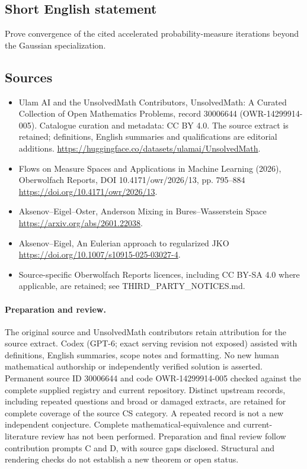 \documentclass[11pt]{article}
\begin{document}
\subsection{Short English statement}
Prove convergence of the cited accelerated probability-measure iterations beyond the Gaussian specialization.
\subsection{Sources}
\begin{itemize}
\item[\hypertarget{source:30006644:1}{S1}] Ulam AI and the UnsolvedMath Contributors, UnsolvedMath: A Curated Collection of Open Mathematics Problems, record 30006644 (OWR-14299914-005). Catalogue curation and metadata: CC BY 4.0. The source extract is retained; definitions, English summaries and qualifications are editorial additions.
\url{https://huggingface.co/datasets/ulamai/UnsolvedMath}.
\item[\hypertarget{source:30006644:2}{S2}] Flows on Measure Spaces and Applications in Machine Learning (2026), Oberwolfach Reports, DOI 10.4171/owr/2026/13, pp. 795--884
\url{https://doi.org/10.4171/owr/2026/13}.
\item[\hypertarget{source:30006644:3}{S3}] Aksenov--Eigel--Oster, Anderson Mixing in Bures--Wasserstein Space
\url{https://arxiv.org/abs/2601.22038}.
\item[\hypertarget{source:30006644:4}{S4}] Aksenov--Eigel, An Eulerian approach to regularized JKO
\url{https://doi.org/10.1007/s10915-025-03027-4}.
\item Source-specific Oberwolfach Reports licences, including CC BY-SA 4.0 where applicable, are retained; see THIRD\_PARTY\_NOTICES.md.
\end{itemize}
\paragraph{Preparation and review.}
The original source and UnsolvedMath contributors retain attribution for the source extract. Codex (GPT-6; exact serving revision not exposed) assisted with definitions, English summaries, scope notes and formatting. No new human mathematical authorship or independently verified solution is asserted. Permanent source ID 30006644 and code OWR-14299914-005 checked against the complete supplied registry and current repository. Distinct upstream records, including repeated questions and broad or damaged extracts, are retained for complete coverage of the source CS category. A repeated record is not a new independent conjecture. Complete mathematical-equivalence and current-literature review has not been performed. Preparation and final review follow contribution prompts C and D, with source gaps disclosed. Structural and rendering checks do not establish a new theorem or open status.
\label{end:30006644}
\end{document}
